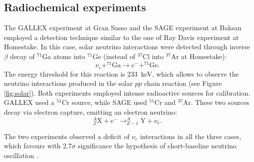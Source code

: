 \subsection{Radiochemical experiments}
    The GALLEX experiment at Gran Sasso and the SAGE experiment at Baksan employed a detection technique similar to the one of Ray Davis experiment at Homestake. In this case, solar neutrino interactions were detected through inverse $\beta$ decay of $^{71}$Ga atoms into $^{71}$Ge (instead of $^{37}$Cl into $^{37}$Ar at Homestake):
\begin{equation}
    \nu_e + ^{71}\mathrm{Ga} \rightarrow e^- + ^{71}\mathrm{Ge}.
\end{equation}
The energy threshold for this reaction is 233~keV, which allows to observe the neutrino interactions produced in the solar $pp$ chain reaction (see Figure \ref{fig:solar}). Both experiments employed intense radioactive sources for calibration. GALLEX used a $^{51}$Cr source, while SAGE used $^{51}$Cr and $^{37}$Ar. These two sources decay via electron capture, emitting an electron neutrino:
\begin{equation} 
    ^{A}_{Z}\mathrm{X} + e^{-} \rightarrow ^{A}_{Z-1}\mathrm{Y} + \nu_{e}.
\end{equation}

The two experiments observed a deficit of $\nu_{e}$ interactions in all the three cases, which favours with $2.7\sigma$ significance the hypothesis of short-baseline neutrino oscillation \cite{Giunti:2010zu}.

